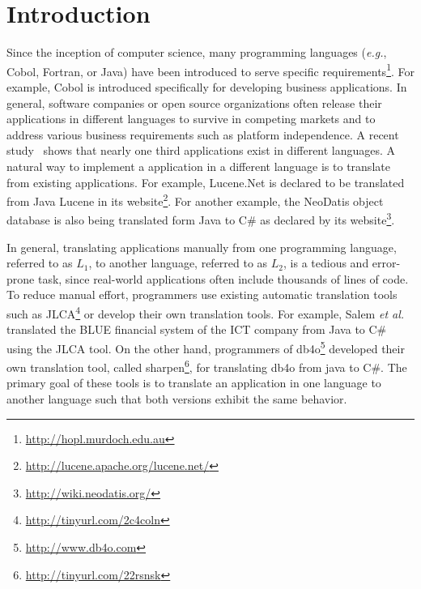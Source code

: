 \section{Introduction}
\label{sec:introduction}

Since the inception of computer science, many programming languages (\emph{e.g.}, Cobol, Fortran, or Java) have been introduced to serve specific requirements\footnote{\url{http://hopl.murdoch.edu.au}}. For example, Cobol is introduced specifically for developing business applications. In general, software companies or open source organizations often release their applications in different languages to survive in competing markets and to address various business requirements such as platform independence. A recent study~\cite{jones1998estimating} shows that nearly one third applications exist in different languages. A natural way to implement a application in a different language is to translate from existing applications. For example, Lucene.Net is declared to be translated from Java Lucene in its website\footnote{\url{http://lucene.apache.org/lucene.net/}}. For another example, the NeoDatis object database is also being translated form Java to C\# as declared by its website\footnote{\url{http://wiki.neodatis.org/}}.

In general, translating applications manually from one programming language, referred to as $L_1$, to another language, referred to as $L_2$, is a tedious and error-prone task, since real-world applications often include thousands of lines of code. To reduce manual effort, programmers use existing automatic translation tools such as JLCA\footnote{\url{http://tinyurl.com/2c4coln}} or develop their own translation tools. For example, Salem \emph{et al.}~\cite{AgtashAEMBS06} translated the BLUE financial system of the ICT company from Java to C\# using the JLCA tool. On the other hand, programmers of db4o\footnote{\url{http://www.db4o.com}} developed their own translation tool, called sharpen\footnote{\url{http://tinyurl.com/22rsnsk}}, for translating db4o from java to C\#. The primary goal of these tools is to translate an application in one language to another language such that both versions exhibit the same behavior.

